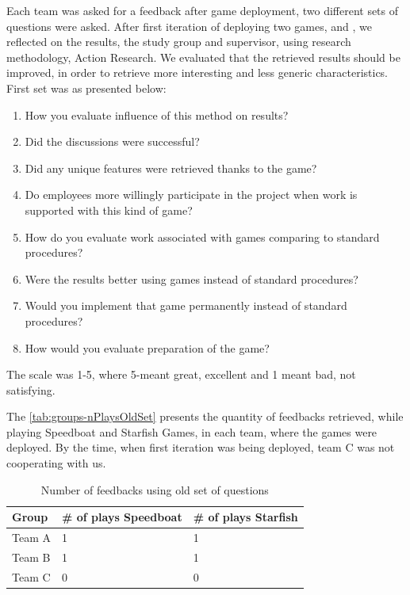 Each team was asked for a feedback after game deployment, two different sets of questions were asked. After first iteration of deploying two games,  and , we reflected on the results, the study group and supervisor, using research methodology, Action Research. We evaluated that the retrieved results should be improved, in order to retrieve more interesting and less generic characteristics. First set was as presented below:
\begin{enumerate}
    \item How you evaluate influence of this method on results?
	\item Did the discussions were successful?
	\item Did any unique features were retrieved thanks to the game?
	\item Do employees more willingly participate in the project when work is supported with this kind of game?
	\item How do you evaluate work associated with games comparing to standard procedures?
	\item Were the results better using games instead of standard procedures?	
	\item Would you implement that game permanently instead of standard procedures?
	\item How would you evaluate preparation of the game?
\end{enumerate}
The scale was 1-5, where 5-meant great, excellent and 1 meant bad, not satisfying. 

The \autoref{tab:groups-nPlaysOldSet} presents the quantity of feedbacks retrieved, while playing Speedboat and Starfish Games, in each team, where the games were deployed. By the time, when first iteration was being deployed, team C was not cooperating with us.
\newline


\begin{table}[!htbp]
	\caption{Number of feedbacks using old set of questions}
	\label{tab:groups-nPlaysOldSet}
	\begin{tabularx}{\textwidth}{|X|X|X|}
	\hline
		Group & \# of plays Speedboat & \# of plays Starfish \\ \hline
		Team A & 1 & 1  \\ \hline
		Team B & 1 & 1 \\ \hline
		Team C & 0 & 0 \\ \hline
	\end{tabularx}
\end{table}

